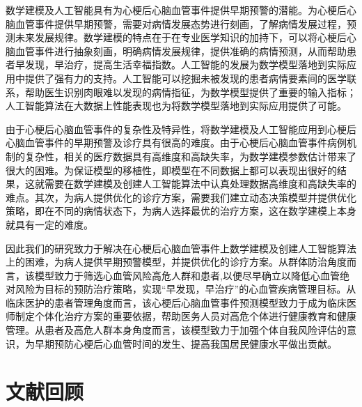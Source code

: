 \documentclass{article}
\begin{document}
\par
数学建模及人工智能具有为心梗后心脑血管事件提供早期预警的潜能。为心梗后心脑血管事件提供早期预警，需要对病情发展态势进行刻画，了解病情发展过程，预测未来发展规律。数学建模的特点在于在专业医学知识的加持下，可以将心梗后心脑血管事件进行抽象刻画，明确病情发展规律，提供准确的病情预测，从而帮助患者早发现，早治疗，提高生活幸福指数。人工智能的发展为数学模型落地到实际应用中提供了强有力的支持。人工智能可以挖掘未被发现的患者病情要素间的医学联系，帮助医生识别肉眼难以发现的病情指征，为数学模型提供了重要的输入指标；人工智能算法在大数据上性能表现也为将数学模型落地到实际应用提供了可能。
\par
由于心梗后心脑血管事件的复杂性及特异性，将数学建模及人工智能应用到心梗后心脑血管事件的早期预警及诊疗具有很高的难度。由于心梗后心脑血管事件病例机制的复杂性，相关的医疗数据具有高维度和高缺失率，为数学建模参数估计带来了很大的困难。为保证模型的移植性，即模型在不同数据上都可以表现出很好的结果，这就需要在数学建模及创建人工智能算法中认真处理数据高维度和高缺失率的难点。其次，为病人提供优化的诊疗方案，需要我们建立动态决策模型并提供优化策略，即在不同的病情状态下，为病人选择最优的治疗方案，这在数学建模上本身就具有一定的难度。
\par
因此我们的研究致力于解决在心梗后心脑血管事件上数学建模及创建人工智能算法上的困难，为病人提供早期预警模型，并提供优化的诊疗方案。从群体防治角度而言，该模型致力于筛选心血管风险高危人群和患者,以便尽早确立以降低心血管绝对风险为目标的预防治疗策略，实现“早发现，早治疗”的心血管疾病管理目标。从临床医护的患者管理角度而言，该心梗后心脑血管事件预测模型致力于成为临床医师制定个体化治疗方案的重要依据，帮助医务人员对高危个体进行健康教育和健康管理。从患者及高危人群本身角度而言，该模型致力于加强个体自我风险评估的意识，为早期预防心梗后心血管时间的发生、提高我国居民健康水平做出贡献。

\section{文献回顾}
\end{document}
